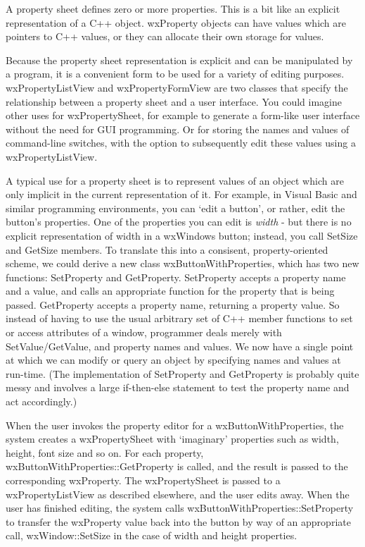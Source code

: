 A property sheet defines zero or more properties. This is a bit like an explicit representation of
a C++ object. wxProperty objects can have values which are pointers to C++ values, or they
can allocate their own storage for values.

Because the property sheet representation is explicit and can be manipulated by
a program, it is a convenient form to be used for a variety of
editing purposes. wxPropertyListView and wxPropertyFormView are two classes that
specify the relationship between a property sheet and a user interface. You could imagine
other uses for wxPropertySheet, for example to generate a form-like user interface without
the need for GUI programming. Or for storing the names and values of command-line switches, with the
option to subsequently edit these values using a wxPropertyListView.

A typical use for a property sheet is to represent values of an object
which are only implicit in the current representation of it. For
example, in Visual Basic and similar programming environments, you can
`edit a button', or rather, edit the button's properties.  One of the
properties you can edit is {\it width} - but there is no explicit
representation of width in a wxWindows button; instead, you call SetSize
and GetSize members. To translate this into a consisent,
property-oriented scheme, we could derive a new class
wxButtonWithProperties, which has two new functions: SetProperty and
GetProperty.  SetProperty accepts a property name and a value, and calls
an appropriate function for the property that is being passed.
GetProperty accepts a property name, returning a property value. So
instead of having to use the usual arbitrary set of C++ member functions
to set or access attributes of a window, programmer deals merely with
SetValue/GetValue, and property names and values.
We now have a single point at which we can modify or query an object by specifying
names and values at run-time. (The implementation of SetProperty and GetProperty
is probably quite messy and involves a large if-then-else statement to
test the property name and act accordingly.)

When the user invokes the property editor for a wxButtonWithProperties, the system
creates a wxPropertySheet with `imaginary' properties such as width, height, font size
and so on. For each property, wxButtonWithProperties::GetProperty is called, and the result is
passed to the corresponding wxProperty. The wxPropertySheet is passed to a wxPropertyListView
as described elsewhere, and the user edits away. When the user has finished editing, the system calls
wxButtonWithProperties::SetProperty to transfer the wxProperty value back into the button
by way of an appropriate call, wxWindow::SetSize in the case of width and height properties.

